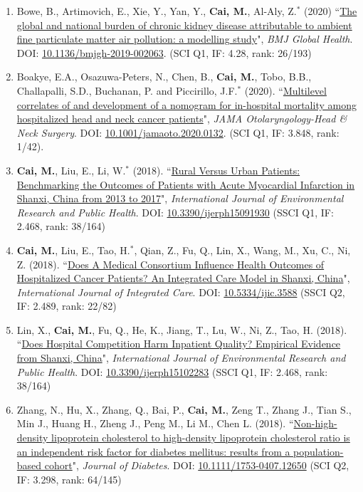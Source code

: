 \documentclass[11pt, a4paper]{article}
\newcommand{\years}[1]{\marginnote{\scriptsize #1}}
\begin{document}
\begin{enumerate}[leftmargin=0ex,itemsep=1ex]
		\item Bowe, B., Artimovich, E., Xie, Y., Yan, Y., \textbf{Cai, M.}, Al-Aly, Z.$^\ast$ (2020) ``\ul{The global and national burden of chronic kidney disease attributable to ambient fine particulate matter air pollution: a modelling study}", \emph{BMJ Global Health}. DOI: \href{https://doi.org/10.1136/bmjgh-2019-002063}{10.1136/bmjgh-2019-002063}. (SCI Q1, IF: 4.28, rank: 26/193)
		
		\item Boakye, E.A., Osazuwa-Peters, N., Chen, B., \textbf{Cai, M.}, Tobo, B.B., Challapalli, S.D., Buchanan, P. and Piccirillo, J.F.$^\ast$ (2020). ``\ul{Multilevel correlates of and development of a nomogram for in-hospital mortality among hospitalized head and neck cancer patients}", \emph{JAMA Otolaryngology-Head \& Neck Surgery}. DOI: \href{https://doi.org/10.1001/jamaoto.2020.0132}{10.1001/jamaoto.2020.0132}. (SCI Q1, IF: 3.848, rank: 1/42).
		
		
		
		\item \textcolor{RubineRed}{\textbf{Cai, M.}}, Liu, E., Li, W.$^\ast$ (2018). ``\ul{Rural Versus Urban Patients: Benchmarking the Outcomes of Patients with Acute Myocardial Infarction in Shanxi, China from 2013 to 2017}", \emph{International Journal of Environmental Research and Public Health}. DOI: \href{https://doi.org/10.3390/ijerph15091930}{10.3390/ijerph15091930} (SSCI Q1, IF: 2.468, rank: 38/164)
		
		\item \textcolor{RubineRed}{\textbf{Cai, M.}}, Liu, E., Tao, H.$^\ast$, Qian, Z., Fu, Q., Lin, X., Wang, M., Xu, C., Ni, Z. (2018). ``\ul{Does A Medical Consortium Influence Health Outcomes of Hospitalized Cancer Patients? An Integrated Care Model in Shanxi, China}", \emph{International Journal of Integrated Care}. DOI: \href{https://doi.org/10.5334/ijic.3588}{10.5334/ijic.3588} (SSCI Q2, IF: 2.489, rank: 22/82)
		
		\item \years{2018}Lin, X., \textbf{Cai, M.}, Fu, Q., He, K., Jiang, T., Lu, W., Ni, Z., Tao, H. (2018). ``\ul{Does Hospital Competition Harm Inpatient Quality? Empirical Evidence from Shanxi, China}", \emph{International Journal of Environmental Research and Public Health}. DOI: \href{https://doi.org/10.3390/ijerph15102283}{10.3390/ijerph15102283} (SSCI Q1, IF: 2.468, rank: 38/164)
		
		\item Zhang, N., Hu, X., Zhang, Q., Bai, P., \textbf{Cai, M.}, Zeng T., Zhang J., Tian S., Min J., Huang H., Zheng J., Peng M., Li M., Chen L. (2018). ``\ul{Non-high-density lipoprotein cholesterol to high-density lipoprotein cholesterol ratio is an independent risk factor for diabetes mellitus: results from a population-based cohort}", \emph{Journal of Diabetes}. DOI: \href{https://doi.org/10.1111/1753-0407.12650}{10.1111/1753-0407.12650} (SCI Q2, IF: 3.298, rank: 64/145)
		

\end{enumerate}
\end{document}
